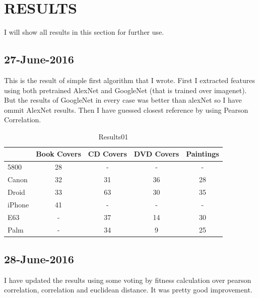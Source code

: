 \chapter{RESULTS}\label{ch:results}
I will show all results in this section for further use.

\section{27-June-2016}
This is the result of simple first algorithm that I wrote. First I extracted features using both pretrained AlexNet and GoogleNet (that is trained over imagenet). But the results of GoogleNet in every case was better than alexNet so I have ommit AlexNet results. Then I have guessed closest reference by using Pearson Correlation.

\begin{table}
{\setlength{\tabcolsep}{14pt}
\caption{Results01}
\begin{center}
  \begin{tabular}{ |l | c | c | c | c | }
    \hline
    		   &Book Covers & CD Covers & DVD Covers & Paintings \\ \hline 
    5800   & 28         & -         & -          & -         \\ \hline 
    Canon  & 32         & 31        & 36         & 28        \\ \hline 
    Droid  & 33         & 63        & 30         & 35        \\ \hline 
    iPhone & 41         & -         & -          & -         \\ \hline 
    E63    & -          & 37	       & 14         & 30        \\ \hline 
    Palm   & -          & 34        & 9          & 25        \\ \hline

  \end{tabular}
\end{center}
\label{results01}}
\end{table}



\section{28-June-2016}
I have updated the results using some voting by fitness calculation over pearson correlation, correlation and euclidean distance. It was pretty good improvement.

